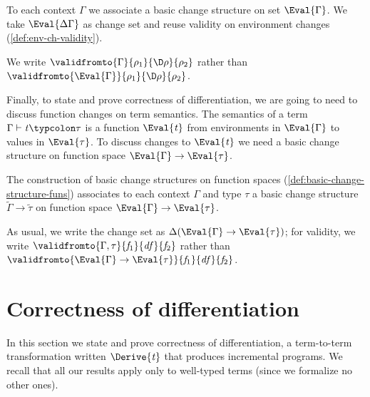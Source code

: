 \begin{definition}
  \label{def:bchs-contexts}
  To each context \ensuremath{\Gamma} we associate a basic change structure on set
  \ensuremath{\Eval{\Gamma}}. We take \ensuremath{\Eval{\Delta \Gamma}} as change set and reuse validity on
  environment changes (\cref{def:env-ch-validity}).
\end{definition}
\begin{notation}
  We write \ensuremath{\validfromto{\Gamma}{\rho_{1}}{\D\rho}{\rho_{2}}} rather than \ensuremath{\validfromto{\Eval{\Gamma}}{\rho_{1}}{\D\rho}{\rho_{2}}}.
\end{notation}

Finally, to state and prove correctness of differentiation, we are going to need
to discuss function changes on term semantics. The semantics of a term \ensuremath{\Gamma\vdash\Varid{t}\typcolon\tau} is a function \ensuremath{\Eval{\Varid{t}}} from environments in \ensuremath{\Eval{\Gamma}} to values in
\ensuremath{\Eval{\tau}}. To discuss changes to \ensuremath{\Eval{\Varid{t}}} we need a basic change structure on
function space \ensuremath{\Eval{\Gamma}\to \Eval{\tau}}.
\begin{lemma}%
  \label{lem:bchs-contexts-types}
  The construction of basic change structures on function spaces
  (\cref{def:basic-change-structure-funs}) associates to each context \ensuremath{\Gamma}
  and type \ensuremath{\tau} a basic change structure \ensuremath{\widetilde{\Gamma}\to \widetilde{\tau}} on function
  space \ensuremath{\Eval{\Gamma}\to \Eval{\tau}}.
\end{lemma}
\begin{notation}
As usual, we write the change set as \ensuremath{\Delta (\Eval{\Gamma}\to \Eval{\tau})}; for
validity, we write \ensuremath{\validfromto{\Gamma,\tau}{\Varid{f}_{1}}{\Varid{df}}{\Varid{f}_{2}}} rather than \ensuremath{\validfromto{\Eval{\Gamma}\to \Eval{\tau}}{\Varid{f}_{1}}{\Varid{df}}{\Varid{f}_{2}}}.
\end{notation}

\section{Correctness of differentiation}
\label{sec:correct-derive}
In this section we state and prove correctness of
differentiation, a term-to-term transformation written
\ensuremath{\Derive{\Varid{t}}} that produces incremental programs. We recall that
all our results apply only to well-typed terms (since we
formalize no other ones).

